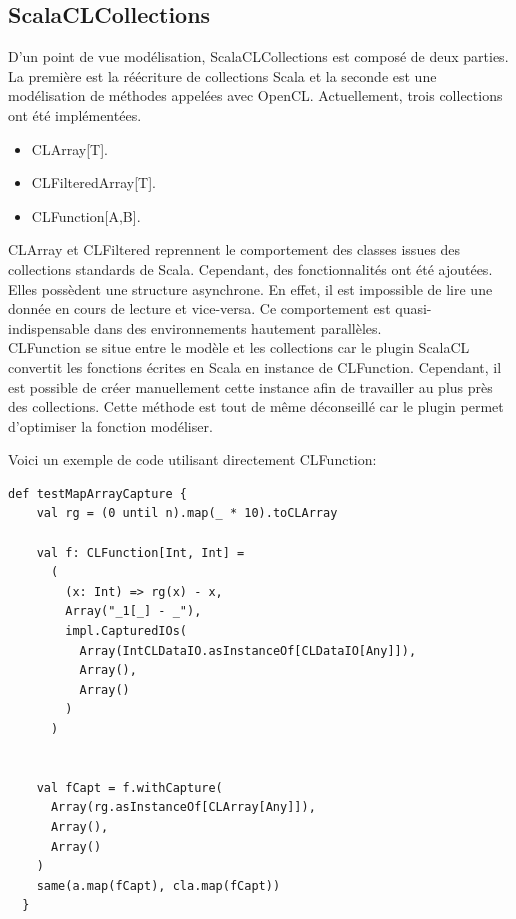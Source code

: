 \documentclass[a4paper,11pt]{report}
\begin{document}
{{\subsection{ScalaCLCollections}
\vspace{6mm}
\normalsize{
D'un point de vue modélisation, ScalaCLCollections est composé de deux parties. La première est la réécriture de collections Scala et la seconde est une modélisation de méthodes appelées avec OpenCL. Actuellement, trois collections ont été implémentées.
}

\begin{itemize}
\item CLArray[T].
\item CLFilteredArray[T].
\item CLFunction[A,B].\\
\end{itemize}

\normalsize{
CLArray et CLFiltered reprennent le comportement des classes issues des collections standards de Scala. Cependant, des fonctionnalités ont été ajoutées. Elles possèdent une structure asynchrone. En effet, il est impossible de lire une donnée en cours de lecture et vice-versa. Ce comportement est quasi-indispensable dans des environnements hautement parallèles.\\

CLFunction se situe entre le modèle et les collections car le plugin ScalaCL convertit les fonctions écrites en Scala en instance de CLFunction. Cependant, il est possible de créer manuellement cette instance afin de travailler au plus près des collections.  Cette méthode est tout de même déconseillé car le plugin permet d'optimiser la fonction modéliser.}

\normalsize{
 Voici un exemple de code utilisant directement CLFunction:
}
\begin{lstlisting}
def testMapArrayCapture {
    val rg = (0 until n).map(_ * 10).toCLArray

    val f: CLFunction[Int, Int] =
      (
        (x: Int) => rg(x) - x, 
        Array("_1[_] - _"),
        impl.CapturedIOs(
          Array(IntCLDataIO.asInstanceOf[CLDataIO[Any]]),
          Array(),
          Array()
        )
      )


    val fCapt = f.withCapture(
      Array(rg.asInstanceOf[CLArray[Any]]),
      Array(),
      Array()
    )
    same(a.map(fCapt), cla.map(fCapt))
  }
\end{lstlisting}

\vspace{6mm}

}}
\end{document}
